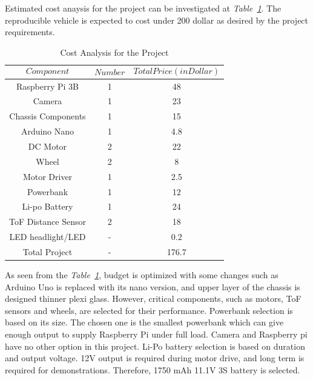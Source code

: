 \documentclass[a4paper,12pt]{article}
\begin{document}
Estimated cost anaysis for the project can be investigated at \textit{Table~\ref{tab:cost}}. The reproducible vehicle is expected to cost under 200 dollar as desired by the project requirements.


\begin{table}[H]

\centering


\caption{Cost Analysis for the Project}

\begin{tabular}{c|c|c}

$$Component$$ & $$Number$$ & $$Total Price (in Dollar)$$  \\ \hline

Raspberry Pi 3B & 1 & 48   \\ \hline

Camera & 1 & 23   \\ \hline

Chassis Components & 1 & 15   \\ \hline

Arduino Nano & 1 &  4.8 \\ \hline

DC Motor & 2 & 22 \\ \hline

Wheel & 2 & 8 \\ \hline

Motor Driver & 1 &  2.5 \\ \hline

Powerbank & 1 & 12 \\ \hline

Li-po Battery  & 1 & 24 \\ \hline

ToF Distance Sensor & 2 & 18 \\ \hline

LED headlight/LED & - & 0.2 \\ \hline


Total Project & - & 176.7 



\end{tabular} 

\label{tab:cost}


\end{table}


As seen from the \textit{Table~\ref{tab:cost}}, budget is optimized with some changes such as Arduino Uno is replaced with its nano version, and upper layer of the chassis is designed thinner plexi glass. However, critical components, such as motors, ToF sensors and wheels, are selected for their performance. Powerbank selection is based on its size. The chosen one is the smallest powerbank which can give enough output to supply Raspberry Pi under full load. Camera and Raspberry pi have no other option in this project. Li-Po battery selection is based on duration and output voltage. 12V output is required during motor drive, and long term is required for demonstrations. Therefore, 1750 mAh 11.1V 3S battery is selected. 
\end{document}
